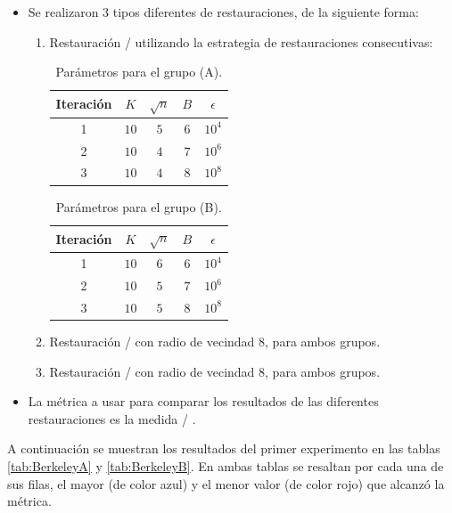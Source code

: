 \begin{itemize}
	\item Se realizaron 3 tipos diferentes de restauraciones, de la siguiente forma:
	\begin{enumerate}
		\item Restauraci\'on \SOP/ utilizando la estrategia de restauraciones consecutivas:
		\begin{table}[H]
			\centering
			\begin{tabular}{|c|cccc|}
				\hline
				Iteraci\'on & $K$ & $\sqrt{n}$ & $B$ & $\epsilon$ \\\hline
				1 & $10$ & $5$ & $6$ & $10^4$\\
				2 & $10$ & $4$ & $7$ & $10^6$\\
				3 & $10$ & $4$ & $8$ & $10^8$\\\hline
			\end{tabular}
			\caption{Par\'ametros para el grupo (A).}
		\end{table}
		\begin{table}[H]
			\centering
			\begin{tabular}{|c|cccc|}
				\hline
				Iteraci\'on & $K$ & $\sqrt{n}$ & $B$ & $\epsilon$ \\\hline
				1 & $10$ & $6$ & $6$ & $10^4$\\
				2 & $10$ & $5$ & $7$ & $10^6$\\
				3 & $10$ & $5$ & $8$ & $10^8$\\\hline
			\end{tabular}
			\caption{Par\'ametros para el grupo (B).}
		\end{table}
		\item Restauraci\'on \TELEA/ con radio de vecindad $8$, para ambos grupos.
		\item Restauraci\'on \NS/ con radio de vecindad $8$, para ambos grupos.
	\end{enumerate}
	\item La m\'etrica a usar para comparar los resultados de las diferentes restauraciones es la medida \PSNR/ \cite{korhonen2012peak}.
\end{itemize}



A continuaci\'on se muestran los resultados del primer experimento en las tablas \ref{tab:BerkeleyA} y \ref{tab:BerkeleyB}. En ambas tablas se resaltan por cada una de sus filas, el mayor (de color azul) y el menor valor (de color rojo) que alcanz\'o la m\'etrica.

